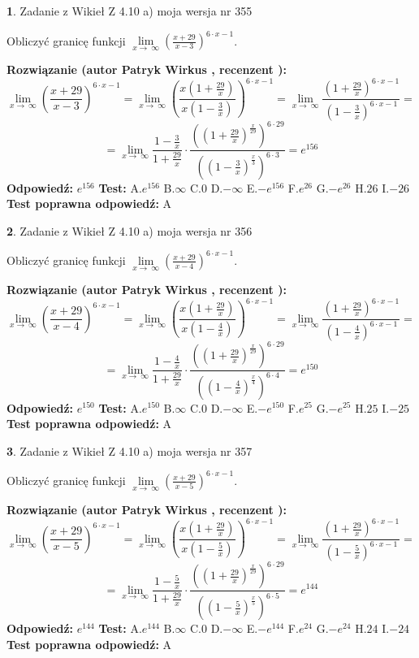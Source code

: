 \documentclass[12pt, a4paper]{article}
\theoremstyle{definition} %
\newtheorem{zad}{}
\newcommand{\zadStart}[1]{\begin{zad}#1\newline}
\newcommand{\zadStop}{\end{zad}}
\newcommand{\rozwStart}[2]{\noindent \textbf{Rozwiązanie (autor #1 , recenzent #2): }\newline}
\newcommand{\rozwStop}{\newline}
\newcommand{\odpStart}{\noindent \textbf{Odpowiedź:}\newline}
\newcommand{\odpStop}{\newline}
\newcommand{\testStart}{\noindent \textbf{Test:}\newline}
\newcommand{\testStop}{\newline}
\newcommand{\kluczStart}{\noindent \textbf{Test poprawna odpowiedź:}\newline}
\newcommand{\kluczStop}{\newline}
\begin{document}
\zadStart{Zadanie z Wikieł Z 4.10 a) moja wersja nr 355}

Obliczyć granicę funkcji  $\lim\limits_{x\to\ \infty}(\frac{x+29}{x-3})^{6\cdot x-1}$.
\zadStop
\rozwStart{Patryk Wirkus}{}
$$\lim\limits_{x\to\ \infty}(\frac{x+29}{x-3})^{6\cdot x-1} = \lim\limits_{x\to\ \infty}(\frac{x(1+\frac{29}{x})}{x(1-\frac{3}{x})})^{6\cdot x-1}=\lim\limits_{x\to\ \infty}\frac{(1+\frac{29}{x})^{6\cdot x-1}}{(1-\frac{3}{x})^{6\cdot x-1}}=$$
$$=\lim\limits_{x\to\ \infty}\frac{1-\frac{3}{x}}{1+\frac{29}{x}}\cdot\frac{((1+\frac{29}{x})^{\frac{x}{29}})^{6\cdot29}}{((1-\frac{3}{x})^{\frac{x}{3}})^{6\cdot3}}=e^{156}$$
\rozwStop
\odpStart
$e^{156}$
\odpStop
\testStart
A.$e^{156}$ B.$\infty$ C.$0$ D.$-\infty$ E.$-e^{156}$
F.$e^{26}$ G.$-e^{26}$
H.$26$
I.$-26$
\testStop
\kluczStart
A
\kluczStop



\zadStart{Zadanie z Wikieł Z 4.10 a) moja wersja nr 356}

Obliczyć granicę funkcji  $\lim\limits_{x\to\ \infty}(\frac{x+29}{x-4})^{6\cdot x-1}$.
\zadStop
\rozwStart{Patryk Wirkus}{}
$$\lim\limits_{x\to\ \infty}(\frac{x+29}{x-4})^{6\cdot x-1} = \lim\limits_{x\to\ \infty}(\frac{x(1+\frac{29}{x})}{x(1-\frac{4}{x})})^{6\cdot x-1}=\lim\limits_{x\to\ \infty}\frac{(1+\frac{29}{x})^{6\cdot x-1}}{(1-\frac{4}{x})^{6\cdot x-1}}=$$
$$=\lim\limits_{x\to\ \infty}\frac{1-\frac{4}{x}}{1+\frac{29}{x}}\cdot\frac{((1+\frac{29}{x})^{\frac{x}{29}})^{6\cdot29}}{((1-\frac{4}{x})^{\frac{x}{4}})^{6\cdot4}}=e^{150}$$
\rozwStop
\odpStart
$e^{150}$
\odpStop
\testStart
A.$e^{150}$ B.$\infty$ C.$0$ D.$-\infty$ E.$-e^{150}$
F.$e^{25}$ G.$-e^{25}$
H.$25$
I.$-25$
\testStop
\kluczStart
A
\kluczStop



\zadStart{Zadanie z Wikieł Z 4.10 a) moja wersja nr 357}

Obliczyć granicę funkcji  $\lim\limits_{x\to\ \infty}(\frac{x+29}{x-5})^{6\cdot x-1}$.
\zadStop
\rozwStart{Patryk Wirkus}{}
$$\lim\limits_{x\to\ \infty}(\frac{x+29}{x-5})^{6\cdot x-1} = \lim\limits_{x\to\ \infty}(\frac{x(1+\frac{29}{x})}{x(1-\frac{5}{x})})^{6\cdot x-1}=\lim\limits_{x\to\ \infty}\frac{(1+\frac{29}{x})^{6\cdot x-1}}{(1-\frac{5}{x})^{6\cdot x-1}}=$$
$$=\lim\limits_{x\to\ \infty}\frac{1-\frac{5}{x}}{1+\frac{29}{x}}\cdot\frac{((1+\frac{29}{x})^{\frac{x}{29}})^{6\cdot29}}{((1-\frac{5}{x})^{\frac{x}{5}})^{6\cdot5}}=e^{144}$$
\rozwStop
\odpStart
$e^{144}$
\odpStop
\testStart
A.$e^{144}$ B.$\infty$ C.$0$ D.$-\infty$ E.$-e^{144}$
F.$e^{24}$ G.$-e^{24}$
H.$24$
I.$-24$
\testStop
\kluczStart
A
\kluczStop
\end{document}

